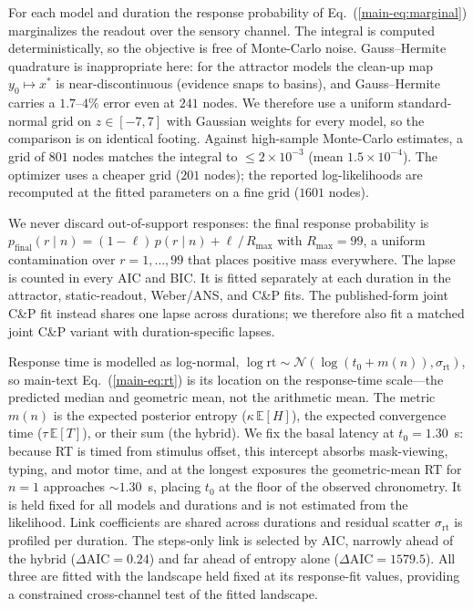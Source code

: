 \documentclass[Afour,sageh,times]{sagej}
\begin{document}
For each model and duration the response probability of Eq.~(\ref{main-eq:marginal}) marginalizes the readout over the sensory channel. The integral is computed deterministically, so the objective is free of Monte-Carlo noise. Gauss--Hermite quadrature is inappropriate here: for the attractor models the clean-up map $y_0 \mapsto x^*$ is near-discontinuous (evidence snaps to basins), and Gauss--Hermite carries a $1.7$--$4\%$ error even at $241$ nodes. We therefore use a uniform standard-normal grid on $z\in[-7,7]$ with Gaussian weights for every model, so the comparison is on identical footing. Against high-sample Monte-Carlo estimates, a grid of $801$ nodes matches the integral to $\le 2\times10^{-3}$ (mean $1.5\times10^{-4}$). The optimizer uses a cheaper grid ($201$ nodes); the reported log-likelihoods are recomputed at the fitted parameters on a fine grid ($1601$ nodes).

We never discard out-of-support responses: the final response probability is $p_{\mathrm{final}}(r \mid n) = (1-\ell)\,p(r \mid n) + \ell\,/\,R_{\max}$ with $R_{\max} = 99$, a uniform contamination over $r=1,\ldots,99$ that places positive mass everywhere. The lapse is counted in every AIC and BIC. It is fitted separately at each duration in the attractor, static-readout, Weber/ANS, and C\&P fits. The published-form joint C\&P fit instead shares one lapse across durations; we therefore also fit a matched joint C\&P variant with duration-specific lapses.

Response time is modelled as log-normal, $\log \mathrm{rt} \sim \mathcal{N}(\log(t_0 + m(n)), \sigma_{\mathrm{rt}})$, so main-text Eq.~(\ref{main-eq:rt}) is its location on the response-time scale---the predicted median and geometric mean, not the arithmetic mean.
The metric $m(n)$ is the expected posterior entropy ($\kappa\,\mathbb{E}[H]$), the expected convergence time ($\tau\,\mathbb{E}[T]$), or their sum (the hybrid). We fix the basal latency at $t_0=1.30$~s: because RT is timed from stimulus offset, this intercept absorbs mask-viewing, typing, and motor time, and at the longest exposures the geometric-mean RT for $n=1$ approaches ${\sim}1.30$~s, placing $t_0$ at the floor of the observed chronometry. It is held fixed for all models and durations and is not estimated from the likelihood. Link coefficients are shared across durations and residual scatter $\sigma_{\mathrm{rt}}$ is profiled per duration. The steps-only link is selected by AIC, narrowly ahead of the hybrid ($\Delta\mathrm{AIC}=0.24$) and far ahead of entropy alone ($\Delta\mathrm{AIC}=1579.5$). All three are fitted with the landscape held fixed at its response-fit values, providing a constrained cross-channel test of the fitted landscape.
\end{document}
